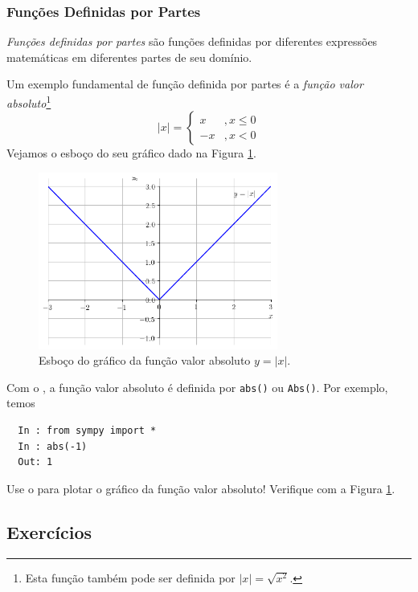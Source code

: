 \subsubsection{Funções Definidas por Partes}

\emph{Funções definidas por partes} são funções definidas por diferentes expressões matemáticas em diferentes partes de seu domínio.

Um exemplo fundamental de função definida por partes é a \emph{função valor absoluto}\footnote{Esta função também pode ser definida por $|x| = \sqrt{x^2}$.}
\begin{equation}
  |x| = \left\{
    \begin{array}{ll}
      x &, x\leq 0\\
      -x &, x<0
    \end{array}
\right.
\end{equation}
Vejamos o esboço do seu gráfico dado na Figura \ref{fig:cap_funcao_funabs}.

\begin{figure}[H]
  \centering
  \includegraphics[width=0.7\textwidth]{./cap_funcao/dados/fig_cap_funcao_funabs/fig_cap_funcao_funabs}
  \caption{Esboço do gráfico da função valor absoluto $y=|x|$.}
  \label{fig:cap_funcao_funabs}
\end{figure}

\ifispython
Com o {\sympy}, a função valor absoluto é definida por \lstinline!abs()! ou \lstinline!Abs()!. Por exemplo, temos 
\begin{lstlisting}
  In : from sympy import *
  In : abs(-1)
  Out: 1
\end{lstlisting}
Use o {\sympy} para plotar o gráfico da função valor absoluto! Verifique com a Figura \ref{fig:cap_funcao_funabs}.
\fi

\subsection*{Exercícios}

